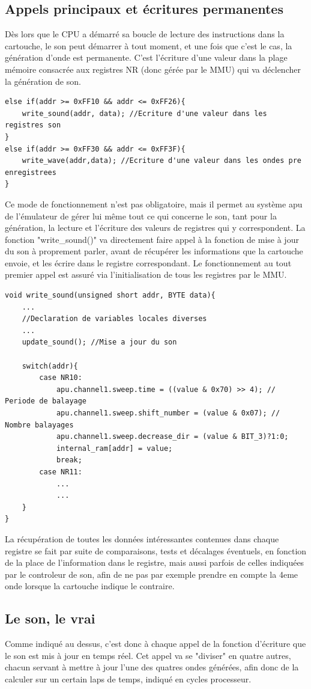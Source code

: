 \documentclass[french]{report}
\begin{document}
\subsection{Appels principaux et écritures permanentes}
Dès lors que le CPU a démarré sa boucle de lecture des instructions dans la cartouche, le son peut démarrer à tout moment, et une fois que c'est le cas, la génération d'onde est permanente.
C'est l'écriture d'une valeur dans la plage mémoire consacrée aux registres NR (donc gérée par le MMU) qui va déclencher la génération de son.
\begin{lstlisting}
else if(addr >= 0xFF10 && addr <= 0xFF26){
	write_sound(addr, data); //Ecriture d'une valeur dans les registres son
}
else if(addr >= 0xFF30 && addr <= 0xFF3F){
	write_wave(addr,data); //Ecriture d'une valeur dans les ondes pre enregistrees
}
\end{lstlisting}
Ce mode de fonctionnement n'est pas obligatoire, mais il permet au système apu de l'émulateur de gérer lui même tout ce qui concerne le son, tant pour la génération, la lecture et l'écriture des valeurs de registres qui y correspondent.
La fonction "write\_sound()" va directement faire appel à la fonction de mise à jour du son à proprement parler, avant de récupérer les informations que la cartouche envoie, et les écrire dans le registre correspondant. Le fonctionnement au tout premier appel est assuré via l'initialisation de tous les registres par le MMU.
\begin{lstlisting}
void write_sound(unsigned short addr, BYTE data){
	...
	//Declaration de variables locales diverses
	...
	update_sound(); //Mise a jour du son

	switch(addr){
		case NR10:
			apu.channel1.sweep.time = ((value & 0x70) >> 4); // Periode de balayage
			apu.channel1.sweep.shift_number = (value & 0x07); // Nombre balayages
			apu.channel1.sweep.decrease_dir = (value & BIT_3)?1:0;
			internal_ram[addr] = value;
			break;
		case NR11:
			...
			...
	}
}
\end{lstlisting}
La récupération de toutes les données intéressantes contenues dans chaque registre se fait par suite de comparaisons, tests et décalages éventuels, en fonction de la place de l'information dans le registre, mais aussi 
parfois de celles indiquées par le controleur de son, afin de ne pas par exemple prendre en compte la 4eme onde lorsque la cartouche indique le contraire.
\subsection{Le son, le vrai}
Comme indiqué au dessus, c'est donc à chaque appel de la fonction d'écriture que le son est mis à jour en temps réel.
Cet appel va se "diviser" en quatre autres, chacun servant à mettre à jour l'une des quatres ondes générées, afin donc de la calculer sur un certain laps de temps, indiqué en cycles processeur.
\end{document}
